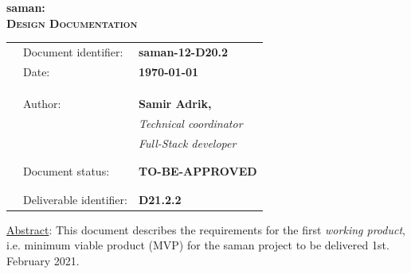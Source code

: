 \documentclass[../main.tex]{subfiles}
\begin{document}
\nopagecolor
\newpage{\pagestyle{empty}\cleardoublepage}

\newpage

\begin{center}
    \vspace*{5cm}
    \Large
    \textbf{saman:\\ \textsc{Design Documentation}}
\end{center}

\begin{tabularx}{\textwidth}{p{5.5cm}XX}
\toprule
 & Document identifier: & \textbf{saman-12-D20.2}\\
 & Date: & \textbf{\today}\\
 &\\
 &\\
 &\\
 & Author: & \textbf{Samir Adrik,}\\
 & & \textit{Technical coordinator}\\
 & & \textit{Full-Stack developer}\\
 &\\
 &\\
 & Document status: & \textbf{TO-BE-APPROVED}\\
 &\\
 &\\
 & Deliverable identifier: & \textbf{D21.2.2}\\
\bottomrule
\end{tabularx}

\noindent \underline{Abstract}: This document describes the requirements for the first \textit{working product}, i.e. minimum viable product (MVP) for the saman project to be delivered 1st. February 2021.
\end{document}
